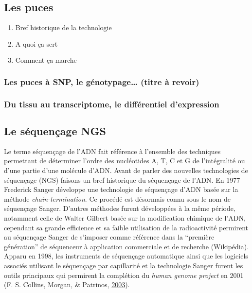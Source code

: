 \documentclass[12pt,twoside]{reedthesis}
\providecommand{\tightlist}{%
  \setlength{\itemsep}{0pt}\setlength{\parskip}{0pt}}
\theoremstyle{definition}
\theoremstyle{definition}
\theoremstyle{remark}
\begin{document}
  \subsection{Les puces}\label{les-puces}
  
  \begin{enumerate}
  \def\labelenumi{\arabic{enumi}.}
  \tightlist
  \item
    Bref historique de la technologie\\
  \item
    A quoi ça sert
  \item
    Comment ça marche
  \end{enumerate}
  
  \subsubsection{Les puces à SNP, le génotypage\ldots{} (titre à
  revoir)}\label{les-puces-a-snp-le-genotypage-titre-a-revoir}
  
  \subsubsection{Du tissu au transcriptome, le différentiel
  d'expression}\label{du-tissu-au-transcriptome-le-differentiel-dexpression}
  
  \subsection{Le séquençage NGS}\label{ngs}
  
  Le terme séquençage de l'ADN fait référence à l'ensemble des techniques
  permettant de déterminer l'ordre des nucléotides A, T, C et G de
  l'intégralité ou d'une partie d'une molécule d'ADN. Avant de parler des
  nouvelles technologies de séquençage (NGS) faisons un bref historique du
  séquençage de l'ADN. En 1977 Frederick Sanger développe une technologie
  de séquençage d'ADN basée sur la méthode \emph{chain-termination}. Ce
  procédé est désormais connu sous le nom de séquençage Sanger. D'autres
  méthodes furent développées à la même période, notamment celle de Walter
  Gilbert basée sur la modification chimique de l'ADN, cependant sa grande
  efficience et sa faible utilisation de la radioactivité permirent au
  séquençage Sanger de s'imposer comme référence dans la ``première
  génération'' de séquenceur à application commerciale et de recherche
  (\href{http://en.wikipedia.org/wiki/DNA_sequencing}{Wikipédia}). Apparu
  en 1998, les instruments de séquençage automatique ainsi que les
  logiciels associés utilisant le séquençage par capillarité et la
  technologie Sanger furent les outils principaux qui permirent la
  complétion du \emph{human genome project} en 2001 (F. S. Collins,
  Morgan, \& Patrinos, \protect\hyperlink{ref-Collins2003}{2003}).
  
\end{document}
